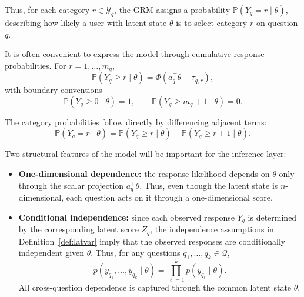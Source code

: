 \documentclass{article}
\begin{document}
Thus, for each category $r \in \mathcal Y_q$, the GRM assigns a probability
$\mathbb P(Y_q = r \mid \theta)$, describing how likely a user with latent
state $\theta$ is to select category $r$ on question $q$.


It is often convenient to express the model through cumulative response probabilities.
For $r = 1,\dots,m_q$,
\begin{equation*}
\mathbb P(Y_q \ge r \mid \theta)
=
\Phi(a_q^\top \theta - \tau_{q,r}),
\label{eq:grm_cumulative}
\end{equation*}
with boundary conventions
\begin{equation}
\mathbb P(Y_q \ge 0 \mid \theta) = 1,
\qquad
\mathbb P(Y_q \ge m_q+1 \mid \theta) = 0.
\label{eq:grm_boundary_conventions}
\end{equation}

The category probabilities follow directly by differencing adjacent terms:
\begin{equation}
\mathbb P(Y_q = r \mid \theta)
=
\mathbb P(Y_q \ge r \mid \theta)
-
\mathbb P(Y_q \ge r+1 \mid \theta).
\label{eq:grm_differencing}
\end{equation}


Two structural features of the model will be important for the inference layer:
\begin{itemize}
    \item \textbf{One-dimensional dependence:}
the response likelihood depends on $\theta$ only through the scalar projection
$a_q^\top \theta$. Thus, even though the latent state is $n$-dimensional, each question acts on it through a one-dimensional score.
\item \textbf{Conditional independence:}
since each observed response $Y_q$ is determined by the corresponding latent score
$Z_q$, the independence assumptions in Definition~\ref{def:latvar} imply that the
observed responses are conditionally independent given $\theta$. Thus, for any
questions $q_1,\dots,q_k \in \mathcal Q$,
\begin{equation}
p(y_{q_1},\dots,y_{q_k}\mid \theta)
=
\prod_{\ell=1}^k p(y_{q_\ell}\mid \theta).
\label{eq:conditional_independence_responses}
\end{equation}
All cross-question dependence is captured through the common latent state $\theta$.
\end{itemize}
\end{document}
